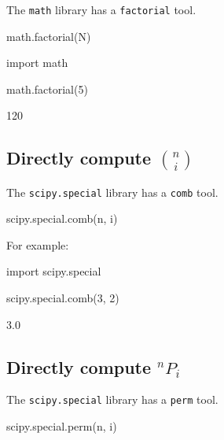 The \texttt{math} library has a \texttt{factorial} tool.


\begin{api}
math.factorial(N)
\end{api}





\begin{pyin}
import math

math.factorial(5)
\end{pyin}





\begin{raw}
120
\end{raw}





\subsection{Directly compute \({n \choose i}\)}

The \texttt{scipy.special} library has a \texttt{comb} tool.


\begin{api}
scipy.special.comb(n, i)
\end{api}



For example:




\begin{pyin}
import scipy.special

scipy.special.comb(3, 2)
\end{pyin}





\begin{raw}
3.0
\end{raw}





\subsection{Directly compute \(^n P_i\)}
\label{\detokenize{tools-for-mathematics/05-combinations-permutations/how/main:directly-computing-n-p-i}}

The \texttt{scipy.special} library has a \texttt{perm} tool.


\begin{api}
scipy.special.perm(n, i)
\end{api}

